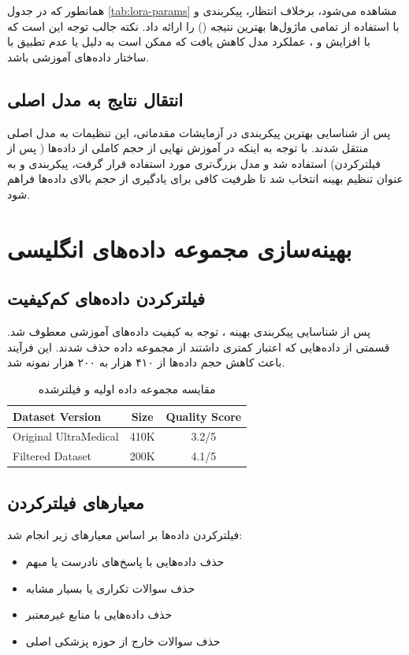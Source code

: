 \documentclass[11pt, a4paper, oneside]{book}
\begin{document}
	\noindent همانطور که در جدول \ref{tab:lora-params} مشاهده می‌شود، برخلاف انتظار، پیکربندی  و  با استفاده از تمامی ماژول‌ها بهترین نتیجه () را ارائه داد. نکته جالب توجه این است که با افزایش  و ، عملکرد مدل کاهش یافت که ممکن است به دلیل  یا عدم تطبیق با ساختار داده‌های آموزشی باشد.

	\subsection{انتقال نتایج به مدل اصلی}
	پس از شناسایی بهترین پیکربندی در آزمایشات مقدماتی، این تنظیمات به مدل اصلی  منتقل شدند. با توجه به اینکه در آموزش نهایی از حجم کاملی از داده‌ها ( پس از فیلترکردن) استفاده شد و مدل بزرگ‌تری مورد استفاده قرار گرفت، پیکربندی  و  به عنوان تنظیم بهینه انتخاب شد تا ظرفیت کافی برای یادگیری از حجم بالای داده‌ها فراهم شود.

	\section{بهینه‌سازی مجموعه داده‌های انگلیسی}
	\subsection{فیلترکردن داده‌های کم‌کیفیت}
	پس از شناسایی پیکربندی بهینه ، توجه به کیفیت داده‌های آموزشی معطوف شد. قسمتی از داده‌هایی که اعتبار کمتری داشتند از مجموعه داده حذف شدند. این فرآیند باعث کاهش حجم داده‌ها از ۴۱۰ هزار به ۲۰۰ هزار نمونه شد.

	\begin{table}[h!]
		\centering
		\caption{مقایسه مجموعه داده اولیه و فیلترشده}
		\label{tab:dataset-comparison}
		\begin{latin}
			\begin{tabular}{lcc}
				\hline
				\textbf{Dataset Version} & \textbf{Size} & \textbf{Quality Score} \\
				\hline
				Original UltraMedical & 410K & 3.2/5 \\
				Filtered Dataset & 200K & 4.1/5 \\
				\hline
			\end{tabular}
		\end{latin}
	\end{table}

	\subsection{معیارهای فیلترکردن}
	فیلترکردن داده‌ها بر اساس معیارهای زیر انجام شد:
	\begin{itemize}
		\item حذف داده‌هایی با پاسخ‌های نادرست یا مبهم
		\item حذف سوالات تکراری یا بسیار مشابه
		\item حذف داده‌هایی با منابع غیرمعتبر
		\item حذف سوالات خارج از حوزه پزشکی اصلی
	\end{itemize}
\end{document}
